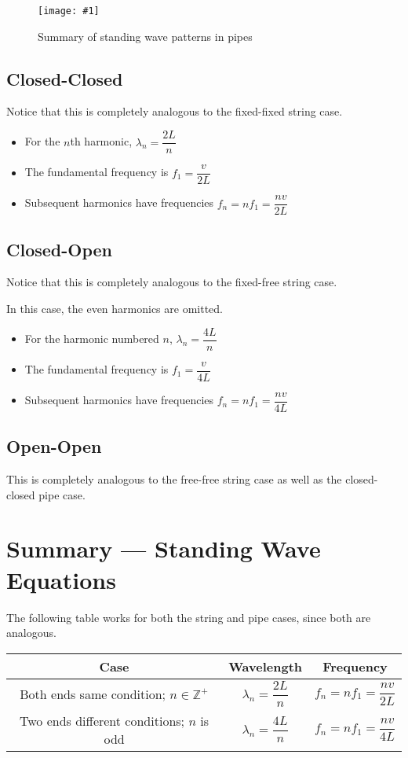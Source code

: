 \documentclass[a4paper,12pt]{article}
\let\oldsection\section
\renewcommand\section{\clearpage\oldsection}
\newcommand{\img}[4]{\begin{center}
  \begin{figure}[H]
    \centering
    \texttt{[image: \#1]}
    \caption{#3}
    \label{fig:#4}
  \end{figure}
\end{center}}
\begin{document}
\pagebreak

\img{pipe_summary.png}{0.95}{Summary of standing wave patterns in pipes}{pipe_summary}

\subsection{Closed-Closed}

Notice that this is completely analogous to the fixed-fixed string case.

\begin{itemize}
  \item For the $n$th harmonic, $\lambda_n = \dfrac{2L}{n}$
  \item The fundamental frequency is $f_1 = \dfrac{v}{2L}$
  \item Subsequent harmonics have frequencies $f_n = nf_1 = \dfrac{nv}{2L}$
\end{itemize}

\subsection{Closed-Open}

Notice that this is completely analogous to the fixed-free string case.

In this case, the even harmonics are omitted.
\begin{itemize}
  \item For the harmonic numbered $n$, $\lambda_n = \dfrac{4L}{n}$
  \item The fundamental frequency is $f_1 = \dfrac{v}{4L}$
  \item Subsequent harmonics have frequencies $f_n = nf_1 = \dfrac{nv}{4L}$
\end{itemize}

\subsection{Open-Open}

This is completely analogous to the free-free string case as well as the closed-closed pipe case.

\section{Summary --- Standing Wave Equations}

The following table works for both the string and pipe cases, since both are analogous.

\begin{table}[H]
  \centering
  \def\arraystretch{1.5}
  \begin{tabular}{|c|c | c|}\hline
    Case                                           & Wavelength                  & Frequency                     \\ \hline
    Both ends same condition; $n \in \mathbb{Z}^+$ & $\lambda_n = \dfrac{2L}{n}$ & $f_n = nf_1 = \dfrac{nv}{2L}$ \\ \hline
    Two ends different conditions; $n$ is odd      & $\lambda_n = \dfrac{4L}{n}$ & $f_n = nf_1 = \dfrac{nv}{4L}$ \\ \hline
  \end{tabular}
\end{table}
\end{document}
